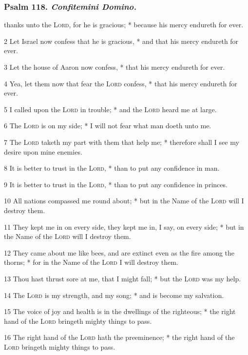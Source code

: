 \subsubsection{Psalm 118. \textit{Confitemini Domino.}}
 thanks unto the \textsc{Lord}, for he is gracious; * because his mercy endureth for ever.
\par
    2 Let Israel now confess that he is gracious, * and that his mercy endureth for ever.
\par
    3 Let the house of Aaron now confess, * that his mercy endureth for ever.
\par
    4 Yea, let them now that fear the \textsc{Lord} confess, * that his mercy endureth for ever.
\par
    5 I called upon the \textsc{Lord} in trouble; * and the \textsc{Lord} heard me at large.
\par
    6 The \textsc{Lord} is on my side; * I will not fear what man doeth unto me.
\par
    7 The \textsc{Lord} taketh my part with them that help me; * therefore shall I see my desire upon mine enemies.
\par
    8 It is better to trust in the \textsc{Lord}, * than to put any confidence in man.
\par
    9 It is better to trust in the \textsc{Lord}, * than to put any confidence in princes.
\par
    10 All nations compassed me round about; * but in the Name of the \textsc{Lord} will I destroy them.
\par
    11 They kept me in on every side, they kept me in, I say, on every side; * but in the Name of the \textsc{Lord} will I destroy them.
\par
    12 They came about me like bees, and are extinct even as the fire among the thorns; * for in the Name of the \textsc{Lord} I will destroy them.
\par
    13 Thou hast thrust sore at me, that I might fall; * but the \textsc{Lord} was my help.
\par
    14 The \textsc{Lord} is my strength, and my song; * and is become my salvation.
\par
    15 The voice of joy and health is in the dwellings of the righteous; * the right hand of the \textsc{Lord} bringeth mighty things to pass.
\par
    16 The right hand of the \textsc{Lord} hath the preeminence; * the right hand of the \textsc{Lord} bringeth mighty things to pass.
\par
